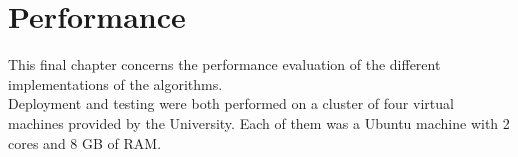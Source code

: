 %       
%
\chapter{Performance}\label{ch:performance}
This final chapter concerns the performance evaluation of the different implementations of the algorithms.\\
Deployment and testing were both performed on a cluster of four virtual machines provided by the University. Each of them was a Ubuntu machine with 2 cores and 8 GB of RAM.\\